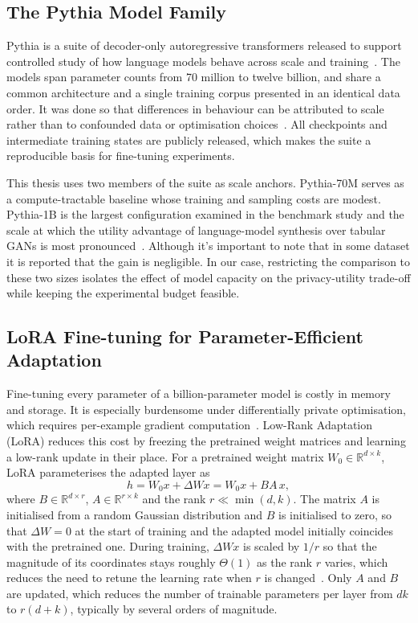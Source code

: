 \subsection{The Pythia Model Family}
\label{sec:bg:llm:pythia}

Pythia is a suite of decoder-only autoregressive transformers released to
support controlled study of how language models behave across scale and
training~\cite{Biderman2023Pythia}. The models span parameter counts from
70 million to twelve billion, and share a common architecture and a
single training corpus presented in an identical data order. It was done so that
differences in behaviour can be attributed to scale rather than to confounded
data or optimisation choices~\cite{Biderman2023Pythia}. All checkpoints and
intermediate training states are publicly released, which makes the suite a
reproducible basis for fine-tuning experiments.

This thesis uses two members of the suite as scale anchors. Pythia-70M serves
as a compute-tractable baseline whose training and sampling costs are modest.
Pythia-1B is the largest configuration examined in the benchmark 
study and the scale at which the utility advantage of
language-model synthesis over tabular GANs is most pronounced~\cite{Miletic2024}. 
Although it's important to note that in some dataset it is reported that 
the gain is negligible. In our case, restricting the
comparison to these two sizes isolates the effect of model capacity on the
privacy-utility trade-off while keeping the experimental budget feasible.

\subsection{LoRA Fine-tuning for Parameter-Efficient Adaptation}
\label{sec:bg:llm:lora}

Fine-tuning every parameter of a billion-parameter model is costly in memory
and storage. It is especially burdensome under differentially private
optimisation, which requires per-example gradient computation~\cite{Yu2022DPFT}. Low-Rank
Adaptation (LoRA) reduces this cost by freezing the pretrained weight matrices
and learning a low-rank update in their place. For a
pretrained weight matrix $W_0 \in \mathbb{R}^{d \times k}$, LoRA parameterises
the adapted layer as
\begin{equation}
\label{eq:bg:llm:lora}
h = W_0 x + \Delta W x = W_0 x + B A\, x,
\end{equation}
where $B \in \mathbb{R}^{d \times r}$, $A \in \mathbb{R}^{r \times k}$ and the
rank $r \ll \min(d, k)$. The matrix $A$ is initialised from a random Gaussian
distribution and $B$ is initialised to zero, so that $\Delta W = 0$ at the
start of training and the adapted model initially coincides with the
pretrained one. During training, $\Delta W x$ is scaled by
$1/r$ so that the magnitude of its coordinates stays roughly $\Theta(1)$ as the
rank $r$ varies, which reduces the need to retune the learning rate when $r$ is
changed~\cite{Hu2022LoRA}. Only $A$ and $B$ are updated, which reduces the
number of trainable parameters per layer from $dk$ to $r(d + k)$, typically by
several orders of magnitude.

